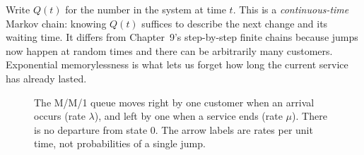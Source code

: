 Write $Q(t)$ for the number in the system at time $t$. This is a \emph{continuous-time} Markov chain: knowing $Q(t)$ suffices to describe the next change and its waiting time. It differs from Chapter~9's step-by-step finite chains because jumps now happen at random times and there can be arbitrarily many customers. Exponential memorylessness is what lets us forget how long the current service has already lasted.

\begin{figure}[ht]
\centering
{}
\caption{The M/M/1 queue moves right by one customer when an arrival occurs (rate $\lambda$), and left by one when a service ends (rate $\mu$). There is no departure from state $0$. The arrow labels are rates per unit time, not probabilities of a single jump.}
\label{fig:queue-rates}
\end{figure}

